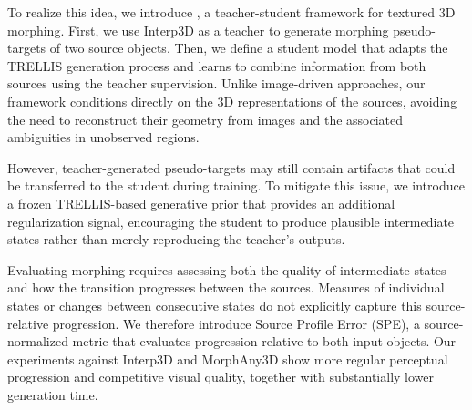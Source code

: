 To realize this idea, we introduce \methodname{}, a teacher-student framework for textured 3D morphing. First, we use Interp3D as a teacher to generate morphing pseudo-targets of two source objects.
Then, we define a student model that adapts the TRELLIS generation process and learns to combine information from both sources using the teacher supervision. 
Unlike image-driven approaches, our framework conditions directly on the 3D representations of the sources, avoiding the need to reconstruct their geometry from images and the associated ambiguities in unobserved regions. 

However, teacher-generated pseudo-targets may still contain artifacts that could be transferred to the student during training. To mitigate this issue, we introduce a frozen TRELLIS-based generative prior that provides an additional regularization signal, encouraging the student to produce plausible intermediate states rather than merely reproducing the teacher's outputs.

Evaluating morphing requires assessing both the quality of intermediate states and how the transition progresses between the sources. Measures of individual states or changes between consecutive states do not explicitly capture this source-relative progression. We therefore introduce Source Profile Error (SPE), a source-normalized metric that evaluates progression relative to both input objects. Our experiments against Interp3D and MorphAny3D show more regular perceptual progression and competitive visual quality, together with substantially lower generation time.

